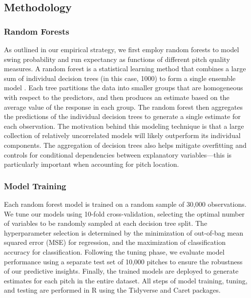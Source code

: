 \documentclass[12pt]{article}
\numberwithin{equation}{section}
\begin{document}
\subsection{Methodology}

\subsubsection{Random Forests}

As outlined in our empirical strategy, we first employ random forests to model swing probability and  run expectancy as functions of different pitch quality measures.  A random forest is a statistical learning method that combines a large sum of individual decision trees (in this case, 1000) to form a single ensemble model \parencite{james_introduction_2013}. Each tree partitions the data into smaller groups that are homogeneous with respect to the predictors, and then produces an estimate based on the average value of the response in each group. The random forest then aggregates the predictions of the individual decision trees to generate a single estimate for each observation. The motivation behind this modeling technique is that a large collection of relatively uncorrelated models will likely outperform its individual components. The aggregation of decision trees also helps mitigate overfitting and controls for conditional dependencies between explanatory variables---this is particularly important when accounting for pitch location. 

\subsubsection{Model Training}

Each random forest model is trained on a random sample of 30,000 observations. We tune our models using 10-fold cross-validation, selecting the optimal number of variables to be randomly sampled at each decision tree split. The hyperparameter selection is determined by the minimization of out-of-bag mean squared error (MSE) for regression, and the maximization of classification accuracy for classification. Following the tuning phase, we evaluate model performance using a separate test set of 10,000 pitches to ensure the robustness of our predictive insights. Finally, the trained models are deployed to generate estimates for each pitch in the entire dataset. All steps of model training, tuning, and testing are performed in R using the Tidyverse \parencite{tidyverse} and Caret \parencite{caret} packages.
\end{document}
